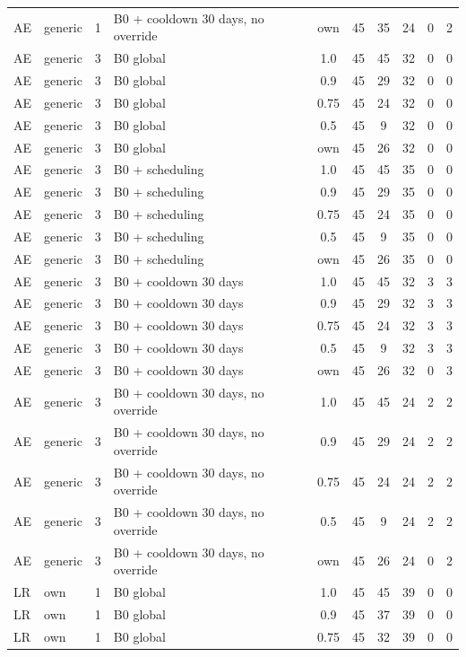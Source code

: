 \begin{longtable}{lllp{4.4cm}cccccc}
AE & generic & 1 & B0 + cooldown 30 days, no override & own & 45 & 35 & 24 & 0 & 2 \\
AE & generic & 3 & B0 global & 1.0 & 45 & 45 & 32 & 0 & 0 \\
AE & generic & 3 & B0 global & 0.9 & 45 & 29 & 32 & 0 & 0 \\
AE & generic & 3 & B0 global & 0.75 & 45 & 24 & 32 & 0 & 0 \\
AE & generic & 3 & B0 global & 0.5 & 45 & 9 & 32 & 0 & 0 \\
AE & generic & 3 & B0 global & own & 45 & 26 & 32 & 0 & 0 \\
AE & generic & 3 & B0 + scheduling & 1.0 & 45 & 45 & 35 & 0 & 0 \\
AE & generic & 3 & B0 + scheduling & 0.9 & 45 & 29 & 35 & 0 & 0 \\
AE & generic & 3 & B0 + scheduling & 0.75 & 45 & 24 & 35 & 0 & 0 \\
AE & generic & 3 & B0 + scheduling & 0.5 & 45 & 9 & 35 & 0 & 0 \\
AE & generic & 3 & B0 + scheduling & own & 45 & 26 & 35 & 0 & 0 \\
AE & generic & 3 & B0 + cooldown 30 days & 1.0 & 45 & 45 & 32 & 3 & 3 \\
AE & generic & 3 & B0 + cooldown 30 days & 0.9 & 45 & 29 & 32 & 3 & 3 \\
AE & generic & 3 & B0 + cooldown 30 days & 0.75 & 45 & 24 & 32 & 3 & 3 \\
AE & generic & 3 & B0 + cooldown 30 days & 0.5 & 45 & 9 & 32 & 3 & 3 \\
AE & generic & 3 & B0 + cooldown 30 days & own & 45 & 26 & 32 & 0 & 3 \\
AE & generic & 3 & B0 + cooldown 30 days, no override & 1.0 & 45 & 45 & 24 & 2 & 2 \\
AE & generic & 3 & B0 + cooldown 30 days, no override & 0.9 & 45 & 29 & 24 & 2 & 2 \\
AE & generic & 3 & B0 + cooldown 30 days, no override & 0.75 & 45 & 24 & 24 & 2 & 2 \\
AE & generic & 3 & B0 + cooldown 30 days, no override & 0.5 & 45 & 9 & 24 & 2 & 2 \\
AE & generic & 3 & B0 + cooldown 30 days, no override & own & 45 & 26 & 24 & 0 & 2 \\
LR & own & 1 & B0 global & 1.0 & 45 & 45 & 39 & 0 & 0 \\
LR & own & 1 & B0 global & 0.9 & 45 & 37 & 39 & 0 & 0 \\
LR & own & 1 & B0 global & 0.75 & 45 & 32 & 39 & 0 & 0 \\

\end{longtable}
